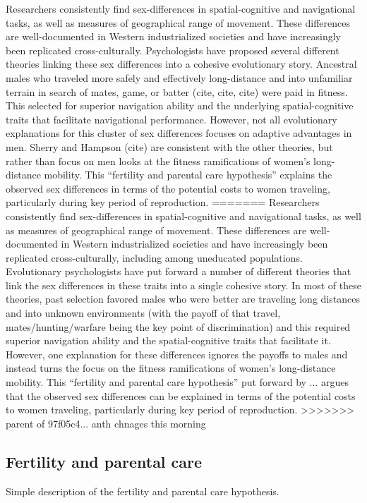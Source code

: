 Researchers consistently find sex-differences in spatial-cognitive and navigational tasks, as well as measures of geographical range of movement.  These differences are well-documented in Western industrialized societies and have increasingly been replicated cross-culturally.  Psychologists have proposed several different theories linking these sex differences into a cohesive evolutionary story.  Ancestral males who traveled more safely and effectively long-distance and into unfamiliar terrain in search of mates, game, or batter (cite, cite, cite) were paid in fitness.  This selected for superior navigation ability and the underlying spatial-cognitive traits that facilitate navigational performance.  However, not all evolutionary explanations for this cluster of sex differences focuses on adaptive advantages in men.  Sherry and Hampson (cite) are consistent with the other theories, but rather than focus on men looks at the fitness ramifications of women's long-distance mobility.  This ``fertility and parental care hypothesis'' explains the observed sex differences in terms of the potential costs to women traveling, particularly during key period of reproduction.
=======
Researchers consistently find sex-differences in spatial-cognitive and navigational tasks, as well as measures of geographical range of movement.  These differences are well-documented in Western industrialized societies and have increasingly been replicated cross-culturally, including among uneducated populations.  Evolutionary psychologists have put forward a number of different theories that link the sex differences in these traits into a single cohesive story.  In most of these theories, past selection favored males who were better are traveling long distances and into unknown environments (with the payoff of that travel, mates/hunting/warfare being the key point of discrimination) and this required superior navigation ability and the spatial-cognitive traits that facilitate it.  However, one explanation for these differences ignores the payoffs to males and instead turns the focus on the fitness ramifications of women's long-distance mobility.  This ``fertility and parental care hypothesis'' put forward by ... argues that the observed sex differences can be explained in terms of the potential costs to women traveling, particularly during key period of reproduction.
>>>>>>> parent of 97f05c4... anth chnages this morning

	\subsection{Fertility and parental care}
	\label{sec:1.1}
Simple description of the fertility and parental care hypothesis.


